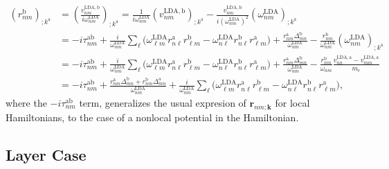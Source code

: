 \begin{align}\label{na_rgendevn}
(r^{\mathrm{b}}_{nm})_{;k^{\mathrm{a}}}
&=\left(\frac{v^{\mathrm{LDA},\mathrm{b}}_{nm}}{i\omega^\mathrm{LDA}_{nm}}\right)_{;k^{\mathrm{a}}}
=
\frac{1}
{i\omega^\mathrm{LDA}_{nm}}
\left( 
v^{\mathrm{LDA},\mathrm{b}}_{nm}
\right)_{;k^{\mathrm{a}}}
-
\frac{v^{\mathrm{LDA},\mathrm{b}}_{nm}}
{i(\omega^\mathrm{LDA}_{nm})^2}
\left(
\omega^\mathrm{LDA}_{nm}
\right)_{;k^{\mathrm{a}}}
\nonumber \\
&=
-i\tau^{\mathrm{a}\mathrm{b}}_{nm}
+
\frac{i}{\omega^\mathrm{LDA}_{nm}}
\sum_{\ell}
\bigg(
\omega^\mathrm{LDA}_{\ell m} 
r^{\mathrm{a}}_{n\ell} 
r^{\mathrm{b}}_{\ell m}
-
\omega^\mathrm{LDA}_{n\ell} 
r^{\mathrm{b}}_{n\ell} 
r^{\mathrm{a}}_{\ell m}
\bigg)
+
\frac{r^{\mathrm{a}}_{nm}
\Delta^{\mathrm{b}}_{mn}}
{\omega^\mathrm{LDA}_{nm}}
-
\frac{r^{\mathrm{b}}_{nm}}
{\omega^\mathrm{LDA}_{nm}}
\left(
\omega^\mathrm{LDA}_{nm}
\right)_{;k^{\mathrm{a}}}
\nonumber \\
&=
-i\tau^{\mathrm{a}\mathrm{b}}_{nm}
+
\frac{i}{\omega^\mathrm{LDA}_{nm}}
\sum_{\ell}
\bigg(
\omega^\mathrm{LDA}_{\ell m} 
r^{\mathrm{a}}_{n\ell} 
r^{\mathrm{b}}_{\ell m}
-
\omega^\mathrm{LDA}_{n\ell} 
r^{\mathrm{b}}_{n\ell} 
r^{\mathrm{a}}_{\ell m}
\bigg)
+
\frac{r^{\mathrm{a}}_{nm}
\Delta^{\mathrm{b}}_{mn}}
{\omega^\mathrm{LDA}_{nm}}
-
\frac{r^{\mathrm{b}}_{nm}}
{\omega_{nm}}
\frac{v^{\mathrm{LDA},\mathrm{a}}_{nn}-v^{\mathrm{LDA},\mathrm{a}}_{mm}}{m_e}
\nonumber \\
&=
-i\tau^{\mathrm{a}\mathrm{b}}_{nm}
+
\frac{ 
r^{\mathrm{a}}_{nm}
\Delta^{\mathrm{b}}_{mn}
+r^{\mathrm{b}}_{nm}
\Delta^{\mathrm{a}}_{mn}
}
{\omega^\mathrm{LDA}_{nm}}
+
\frac{i}{\omega^\mathrm{LDA}_{nm}}
\sum_{\ell}
\bigg(
\omega^\mathrm{LDA}_{\ell m} 
r^{\mathrm{a}}_{n\ell} 
r^{\mathrm{b}}_{\ell m}
-
\omega^\mathrm{LDA}_{n\ell} 
r^{\mathrm{b}}_{n\ell} 
r^{\mathrm{a}}_{\ell m}
\bigg)
,
\end{align} 
where the $-i\tau^{\mathrm{a}\mathrm{b}}_{nm}$ term, generalizes the usual expresion of
$\mathbf{r}_{nm;\mathbf{k}}$ for local 
Hamiltonians,\cite{aversaPRB95,nastosPRB05,cabellosPRB09,rashkeevPRB98}
to
the case of a
nonlocal potential in the Hamiltonian.



\subsection{Layer Case}

